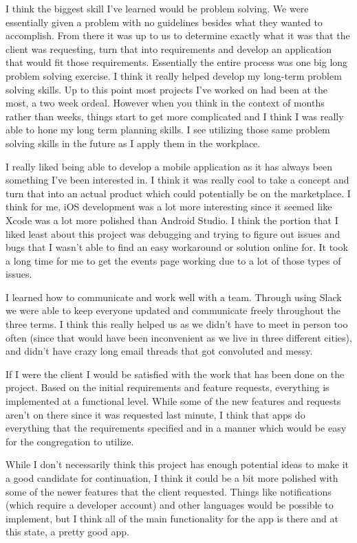 			I think the biggest skill I've learned would be problem solving. We were essentially given a problem with no guidelines besides what they wanted to accomplish. From there it was up to us to determine exactly what it was that the client was requesting, turn that into requirements and develop an application that would fit those requirements. Essentially the entire process was one big long problem solving exercise. I think it really helped develop my long-term problem solving skills. Up to this point most projects I've worked on had been at the most, a two week ordeal. However when you think in the context of months rather than weeks, things start to get more complicated and I think I was really able to hone my long term planning skills. I see utilizing those same problem solving skills in the future as I apply them in the workplace.

			I really liked being able to develop a mobile application as it has always been something I've been interested in. I think it was really cool to take a concept and turn that into an actual product which could potentially be on the marketplace. I think for me, iOS development was a lot more interesting since it seemed like Xcode was a lot more polished than Android Studio. I think the portion that I liked least about this project was debugging and trying to figure out issues and bugs that I wasn't able to find an easy workaround or solution online for. It took a long time for me to get the events page working due to a lot of those types of issues.

			I learned how to communicate and work well with a team. Through using Slack we were able to keep everyone updated and communicate freely throughout the three terms. I think this really helped us as we didn't have to meet in person too often (since that would have been inconvenient as we live in three different cities), and didn't have crazy long email threads that got convoluted and messy.

			If I were the client I would be satisfied with the work that has been done on the project. Based on the initial requirements and feature requests, everything is implemented at a functional level. While some of the new features and requests aren't on there since it was requested last minute, I think that apps do everything that the requirements specified and in a manner which would be easy for the congregation to utilize.

			While I don't necessarily think this project has enough potential ideas to make it a good candidate for continuation, I think it could be a bit more polished with some of the newer features that the client requested. Things like notifications (which require a developer account) and other languages would be possible to implement, but I think all of the main functionality for the app is there and at this state, a pretty good app.
